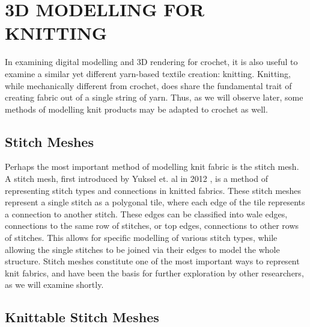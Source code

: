 \documentclass{IEEEcsmag}
\begin{document}
\section{3D MODELLING FOR KNITTING}
In examining digital modelling and 3D rendering for crochet, it is also useful
to examine a similar yet different yarn-based textile creation: knitting.
Knitting, while mechanically different from crochet, does share the fundamental
trait of creating fabric out of a single string of yarn. Thus, as we will
observe later, some methods of modelling knit products may be adapted to
crochet as well.

\subsection{Stitch Meshes}

Perhaps the most important method of modelling knit fabric is the stitch mesh.
A stitch mesh, first introduced by Yuksel et. al in 2012 \cite{detail}, is a
method of representing stitch types and connections in knitted fabrics. These
stitch meshes represent a single stitch as a polygonal tile, where each edge of
the tile represents a connection to another stitch. These edges can be
classified into wale edges, connections to the same row of stitches, or top
edges, connections to other rows of stitches. This allows for specific
modelling of various stitch types, while allowing the single stitches to be
joined via their edges to model the whole structure. Stitch meshes constitute
one of the most important ways to represent knit fabrics, and have been the
basis for further exploration by other researchers, as we will examine shortly.

\subsection{Knittable Stitch Meshes}
\end{document}
